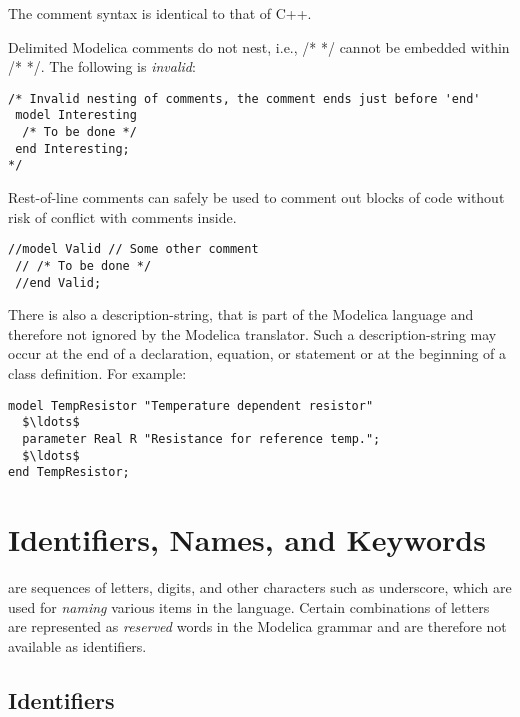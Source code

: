 \begin{nonnormative}
The comment syntax is identical to that of C++.
\end{nonnormative}

Delimited Modelica comments do not nest, i.e., /* */ cannot be embedded within /*
*/. The following is \emph{invalid}:
\begin{lstlisting}[language=modelica]
/* Invalid nesting of comments, the comment ends just before 'end'
 model Interesting
  /* To be done */
 end Interesting;
*/
\end{lstlisting}
Rest-of-line comments can safely be used to comment out blocks of code without risk of conflict with comments inside.
\begin{lstlisting}[language=modelica]
 //model Valid // Some other comment
 // /* To be done */
 //end Valid;
\end{lstlisting}

There is also a description-string, that is part of the Modelica language and
therefore not ignored by the Modelica translator. Such a description-string may
occur at the end of a declaration, equation, or statement or at the
beginning of a class definition. For example:
\begin{lstlisting}[language=modelica]
model TempResistor "Temperature dependent resistor"
  $\ldots$
  parameter Real R "Resistance for reference temp.";
  $\ldots$
end TempResistor;
\end{lstlisting}

\section{Identifiers, Names, and Keywords}\label{identifiers-names-and-keywords}

 are sequences of letters, digits, and other characters such as underscore, which are used for \emph{naming} various items in the language.
Certain combinations of letters are  represented as \emph{reserved} words in the Modelica grammar and are therefore not available as identifiers.

\subsection{Identifiers}\label{identifiers}

